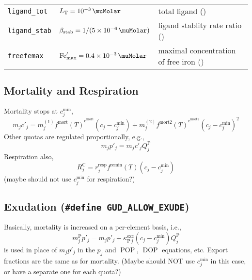 \documentclass[11pt,letterpaper,english]{article}
\renewcommand{\ll}[1]{{\tt #1}}
\def\|#1|{\operatorname{#1}}
\def\tempMort{e^{\|mort|}}
\def\tempMortTWO{e^{\|mort2|}}
\DeclareMathOperator{\Fe}{Fe}
\DeclareMathOperator{\DOP}{DOP}
\DeclareMathOperator{\POP}{POP}
\newcommand{\C}{\mathrm{C}}
\renewcommand{\P}{\mathrm{P}}
\let\unit=\si
\renewcommand{\si}{\mathrm{si}}
\newcommand{\total}{{\mathrm{T}}}
\newcommand{\FeT}{\Fe_\total}
\newcommand{\Ltot}{L_\total}
\newcommand{\stab}{\text{stab}}
\newcommand{\Lstab}{\beta_{\stab}}
\newcommand{\resp}{{\text{resp}}}
\newcommand{\scav}{{\text{scav}}}
\newcommand{\remin}{{\text{remin}}}
\newcommand{\X}{c}
\begin{document}

%

\begin{tabular}{@{}l@{\qquad}l@{${}={}$}l}
\ll{ligand\_tot}  & $\Ltot=\SI{e-3}{\muMolar}$
                  & total ligand (\unit{\muMolar})  \\
\ll{ligand\_stab} & $\Lstab=1/(\SI{5E-6}{\muMolar})$
                  & ligand stablity rate ratio (\unit{\meter\cubed\per\milli\mol}) \\
\ll{freefemax}    & $\Fe'_{\max}=\SI{0.4E-3}{\muMolar}$
                  & maximal concentration of free iron (\unit{\milli\mol\per\meter\cubed})
\end{tabular}






\subsection{Mortality and Respiration}

Mortality stops at $\X_j^{\min}$,
\[
  m_j c'_j = m^{(1)}_j {f^{\|mort|}(T)}^{\tempMort} (\X_j - \X_j^{\min})
      + m^{(2)}_j {f^{\|mort2|}(T)}^{\tempMortTWO} (\X_j - \X_j^{\min})^2
\]
Other quotas are regulated proportionally, e.g.,
\[
  m_j p'_j = m_j c'_j Q^\P_j
\]
Respiration also,
\[
  R^\C_j = r^\resp_j f^\remin(T) (\X_j - \X_j^{\min})
\]
(maybe should not use $\X_j^{\min}$ for respiration?)



\subsection{Exudation ({\tt \#define GUD\_ALLOW\_EXUDE})}

Basically, mortality is increased on a per-element basis, i.e.,
\[
  m_j^{\P} p'_j = m_j p'_j + \kappa^{\|exc|}_{\P\,j} (\X_j - \X_j^{\min}) Q^\P_j
\]
is used in place of $m_j p'_j$ in the $p_j$ and $\POP$, $\DOP$ equations, etc.
Export fractions are the same as for mortality.
(Maybe should NOT use $\X_j^{\min}$ in this case, or have a separate one for each quota?)
\end{document}
